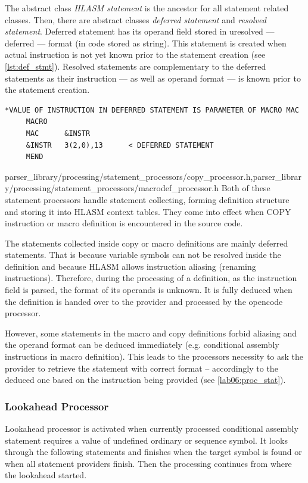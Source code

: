 The abstract class \emph{HLASM statement} is the ancestor for all statement related classes. Then, there are abstract classes \emph{deferred statement} and \emph{resolved statement}. Deferred statement has its operand field stored in uresolved --- deferred --- format (in code stored as string). This statement is created when actual instruction is not yet known prior to the statement creation (see \cref{lst:def_stmt}). Resolved statements are complementary to the deferred statements as their instruction --- as well as operand format --- is known prior to the statement creation.

\begin{listing}[t]
	\begin{verbatim}
*VALUE OF INSTRUCTION IN DEFERRED STATEMENT IS PARAMETER OF MACRO MAC
     MACRO
     MAC      &INSTR
     &INSTR   3(2,0),13      < DEFERRED STATEMENT
     MEND
	\end{verbatim}
	\caption{An example of deferred statement in code.}
	\label{lst:def_stmt}
\end{listing}




{parser\_library/processing/statement\_processors/copy\_processor.h,parser\_library/processing/statement\_processors/macrodef\_processor.h}
Both of these statement processors handle statement collecting, forming definition structure and storing it into HLASM context tables. They come into effect when COPY instruction or macro definition is encountered in the source code. 

The statements collected inside copy or macro definitions are mainly deferred statements. That is because variable symbols can not be resolved inside the definition and because HLASM allows instruction aliasing (renaming instructions). Therefore, during the processing of a definition, as the instruction field is parsed, the format of its operands is unknown. It is fully deduced when the definition is handed over to the provider and processed by the opencode processor.

However, some statements in the macro and copy definitions forbid aliasing and the operand format can be deduced immediately (e.g. conditional assembly instructions in macro definition). This leads to the processors necessity to ask the provider to retrieve the statement with correct format -- accordingly to the deduced one based on the instruction being provided  (see \cref{lab06:proc_stat}).

\subsubsection{Lookahead Processor}
\label{lab06:look}
Lookahead processor is activated when currently processed conditional assembly statement requires a value of undefined ordinary or sequence symbol. It looks through the following statements and finishes when the target symbol is found or when all statement providers finish. Then the processing continues from where the lookahead started.

